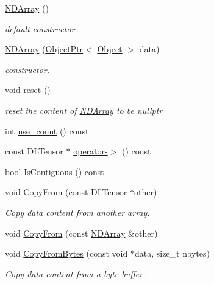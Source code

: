 \begin{DoxyCompactItemize}
\item 
\hyperlink{classtvm_1_1runtime_1_1NDArray_a4bbb80e8e36317829dd63e7f44ffbb0f}{N\+D\+Array} ()
\begin{DoxyCompactList}\small\item\em default constructor \end{DoxyCompactList}\item 
\hyperlink{classtvm_1_1runtime_1_1NDArray_af5801a105ceb450616a83d19c5c92326}{N\+D\+Array} (\hyperlink{classtvm_1_1runtime_1_1ObjectPtr}{Object\+Ptr}$<$ \hyperlink{classtvm_1_1runtime_1_1Object}{Object} $>$ data)
\begin{DoxyCompactList}\small\item\em constructor. \end{DoxyCompactList}\item 
void \hyperlink{classtvm_1_1runtime_1_1NDArray_af2a8ccab95d432d1ecad7a389e11bcd3}{reset} ()
\begin{DoxyCompactList}\small\item\em reset the content of \hyperlink{classtvm_1_1runtime_1_1NDArray}{N\+D\+Array} to be nullptr \end{DoxyCompactList}\item 
int \hyperlink{classtvm_1_1runtime_1_1NDArray_acb2fd06934aac23ba492e78619c7eaa5}{use\+\_\+count} () const 
\item 
const D\+L\+Tensor $\ast$ \hyperlink{classtvm_1_1runtime_1_1NDArray_ae347be13193ee72c6bde285c6ae787ad}{operator-\/$>$} () const 
\item 
bool \hyperlink{classtvm_1_1runtime_1_1NDArray_ac041c89504299f82baf990c9ad081c44}{Is\+Contiguous} () const 
\item 
void \hyperlink{classtvm_1_1runtime_1_1NDArray_a1550151d3616e918d45e047840b81e1e}{Copy\+From} (const D\+L\+Tensor $\ast$other)
\begin{DoxyCompactList}\small\item\em Copy data content from another array. \end{DoxyCompactList}\item 
void \hyperlink{classtvm_1_1runtime_1_1NDArray_a62ceb9ace65922dde15790fff6d04661}{Copy\+From} (const \hyperlink{classtvm_1_1runtime_1_1NDArray}{N\+D\+Array} \&other)
\item 
void \hyperlink{classtvm_1_1runtime_1_1NDArray_af4d489a1208be9cc4248b592769bccf2}{Copy\+From\+Bytes} (const void $\ast$data, size\+\_\+t nbytes)
\begin{DoxyCompactList}\small\item\em Copy data content from a byte buffer. \end{DoxyCompactList}\item 

\end{DoxyCompactItemize}
